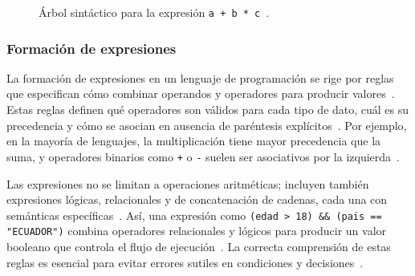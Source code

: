 \documentclass[12pt,twoside]{book}
\begin{document}
						\begin{figure}[hbt!]
							\centering
							\caption{Árbol sintáctico para la expresión \texttt{a + b * c}~\cite{Tanenbaum2021Structured,Stallings2021Computer}.}
							\label{fig:arbol-sintactico}
						\end{figure}
				
					\subsubsection{Formación de expresiones}
						La formación de expresiones en un lenguaje de programación se rige por reglas que especifican cómo combinar operandos y operadores para producir valores~\cite{Gaddis2022Starting}. Estas reglas definen qué operadores son válidos para cada tipo de dato, cuál es su precedencia y cómo se asocian en ausencia de paréntesis explícitos~\cite{Tanenbaum2021Structured}. Por ejemplo, en la mayoría de lenguajes, la multiplicación tiene mayor precedencia que la suma, y operadores binarios como \texttt{+} o \texttt{-} suelen ser asociativos por la izquierda~\cite{Stallings2021Computer}.
						
						Las expresiones no se limitan a operaciones aritméticas; incluyen también expresiones lógicas, relacionales y de concatenación de cadenas, cada una con semánticas específicas~\cite{Sommerville2015Software}. Así, una expresión como \texttt{(edad > 18) \&\& (pais == "ECUADOR")} combina operadores relacionales y lógicos para producir un valor booleano que controla el flujo de ejecución~\cite{Gaddis2022Starting}. La correcta comprensión de estas reglas es esencial para evitar errores sutiles en condiciones y decisiones~\cite{Pressman2019Software}.
						
\end{document}
